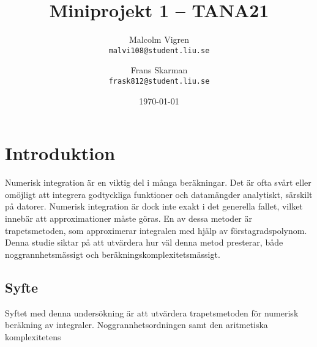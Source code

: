 \documentclass[a4paper,titlepage]{article}
\title{
    \textbf{Miniprojekt 1 -- TANA21}}
\date{\today}
\author{%
    Malcolm Vigren \\
    \texttt{malvi108@student.liu.se}
    \and
    Frans Skarman\\
    \texttt{frask812@student.liu.se}
    }
\begin{document}
	\maketitle
	\newpage
\tableofcontents
\newpage

\section{Introduktion}
Numerisk integration är en viktig del i många beräkningar. Det är ofta svårt
eller omöjligt att integrera godtyckliga funktioner och datamängder analytiskt,
särskilt på datorer. Numerisk integration är dock inte exakt i det generella
fallet, vilket innebär att approximationer måste göras. En av dessa metoder
är trapetsmetoden, som approximerar integralen med hjälp av förstagradspolynom.
Denna studie siktar på att utvärdera hur väl denna metod presterar,
både noggrannhetsmässigt och beräkningskomplexitetsmässigt.

\subsection{Syfte}
Syftet med denna undersökning är att utvärdera trapetsmetoden för numerisk
beräkning av integraler. Noggrannhetsordningen samt den aritmetiska
komplexitetens 
\end{document}
